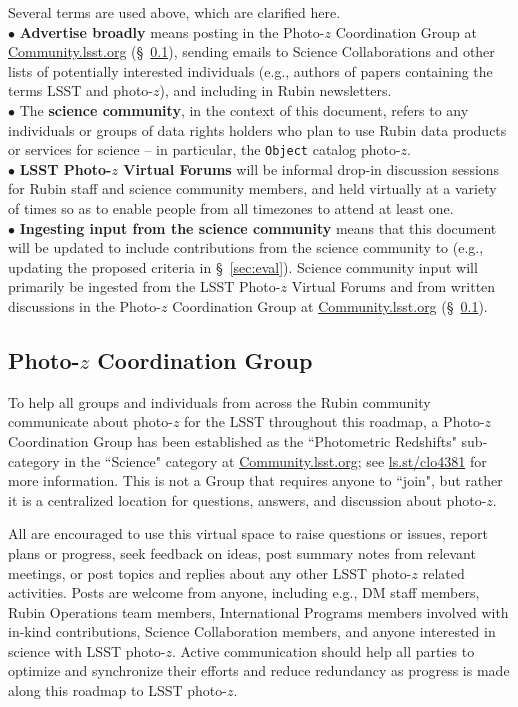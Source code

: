 \documentclass[DM,authoryear,toc]{lsstdoc}
\begin{document}
Several terms are used above, which are clarified here. \\
$\bullet$ {\bf Advertise broadly} means posting in the Photo-$z$ Coordination Group at \url{Community.lsst.org} (\S~\ref{ssec:time_pzcoord}), sending emails to Science Collaborations and other lists of potentially interested individuals (e.g., authors of papers containing the terms LSST and photo-$z$), and including in Rubin newsletters. \\
$\bullet$ The {\bf science community}, in the context of this document, refers to any individuals or groups of data rights holders who plan to use Rubin data products or services for science -- in particular, the {\tt Object} catalog photo-$z$. \\
$\bullet$ {\bf LSST Photo-$z$ Virtual Forums} will be informal drop-in discussion sessions for Rubin staff and science community members, and held virtually at a variety of times so as to enable people from all timezones to attend at least one. \\
$\bullet$ {\bf Ingesting input from the science community} means that this document will be updated to include contributions from the science community to (e.g., updating the proposed criteria in \S~\ref{sec:eval}).
Science community input will primarily be ingested from the LSST Photo-$z$ Virtual Forums and from written discussions in the Photo-$z$ Coordination Group at \url{Community.lsst.org} (\S~\ref{ssec:time_pzcoord}).

\subsection{Photo-$z$ Coordination Group}\label{ssec:time_pzcoord}

To help all groups and individuals from across the Rubin community communicate about photo-$z$ for the LSST throughout this roadmap, a Photo-$z$ Coordination Group has been established as the ``Photometric Redshifts" sub-category in the ``Science" category at \url{Community.lsst.org}; see \url{ls.st/clo4381} for more information.
This is not a Group that requires anyone to ``join", but rather it is a centralized location for questions, answers, and discussion about photo-$z$.

All are encouraged to use this virtual space to raise questions or issues, report plans or progress, seek feedback on ideas, post summary notes from relevant meetings, or post topics and replies about any other LSST photo-$z$ related activities.
Posts are welcome from anyone, including e.g., DM staff members, Rubin Operations team members, International Programs members involved with in-kind contributions, Science Collaboration members, and anyone interested in science with LSST photo-$z$.
Active communication should help all parties to optimize and synchronize their efforts and reduce redundancy as progress is made along this roadmap to LSST photo-$z$.
\end{document}
